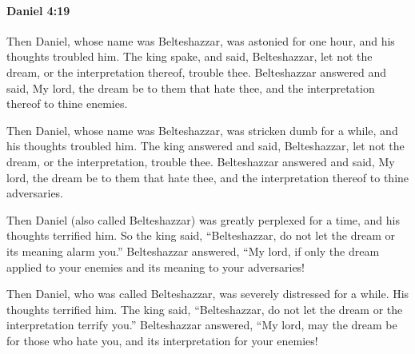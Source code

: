 		\paragraph{Daniel 4:19} %
			\label{DANIEL-4-19}

			Then Daniel, whose name was Belteshazzar, was astonied for one hour, and his thoughts troubled him. The king spake, and said, Belteshazzar, let not the dream, or the interpretation thereof, trouble thee. Belteshazzar answered and said, My lord, the dream be to them that hate thee, and the interpretation thereof to thine enemies.

			\begin{versebox}
					\item[BHS] 
					\item[LXX] 
					\item[ASV] Then Daniel, whose name was Belteshazzar, was stricken dumb for a while, and his thoughts troubled him. The king answered and said, Belteshazzar, let not the dream, or the interpretation, trouble thee. Belteshazzar answered and said, My lord, the dream be to them that hate thee, and the interpretation thereof to thine adversaries.
					\item[NIV] Then Daniel (also called Belteshazzar) was greatly perplexed for a time, and his thoughts terrified him. So the king said, “Belteshazzar, do not let the dream or its meaning alarm you.” Belteshazzar answered, “My lord, if only the dream applied to your enemies and its meaning to your adversaries!
					\item[NRSV] Then Daniel, who was called Belteshazzar, was severely distressed for a while. His thoughts terrified him. The king said, “Belteshazzar, do not let the dream or the interpretation terrify you.” Belteshazzar answered, “My lord, may the dream be for those who hate you, and its interpretation for your enemies!
			\end{versebox}

